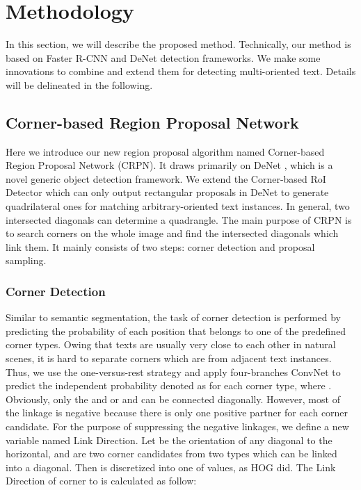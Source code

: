\documentclass[3p, times]{elsarticle}
\begin{document}
\section{Methodology}
In this section, we will describe the proposed method. Technically, our method is based on Faster R-CNN \cite{FASTERRCNN2015NIPS} and DeNet \cite{DENET2017ARXIV} detection frameworks. We make some innovations to combine and extend them for detecting multi-oriented text. Details will be delineated in the following.


\subsection{Corner-based Region Proposal Network}
Here we introduce our new region proposal algorithm named Corner-based Region Proposal Network (CRPN). It draws primarily on DeNet \cite{DENET2017ARXIV}, which is a novel generic object detection framework. We extend the Corner-based RoI Detector which can only output rectangular proposals in DeNet to generate quadrilateral ones for matching arbitrary-oriented text instances. In general, two intersected diagonals can determine a quadrangle. The main purpose of CRPN is to search corners on the whole image and find the intersected diagonals which link them. It mainly consists of two steps:  corner detection and proposal sampling.


\subsubsection{Corner Detection}
Similar to semantic segmentation, the task of corner detection is performed by predicting the probability of each position  that belongs to one of the predefined corner types. Owing that texts are usually very close to each other in natural scenes, it is hard to separate corners which are from adjacent text instances. Thus, we use the one-versus-rest strategy and apply four-branches ConvNet to predict the independent probability denoted as  for each corner type, where . Obviously, only the  and  or  and  can be connected diagonally. However, most of the linkage is negative because there is only one positive partner for each corner candidate. For the purpose of suppressing the negative linkages, we define a new variable named Link Direction. Let  be the orientation of any diagonal  to the horizontal,  and  are two corner candidates from two types which can be linked into a diagonal. Then  is discretized into one of  values, as HOG \cite{HOG2005CVPR} did. The Link Direction of corner  to  is calculated as follow:
\end{document}
